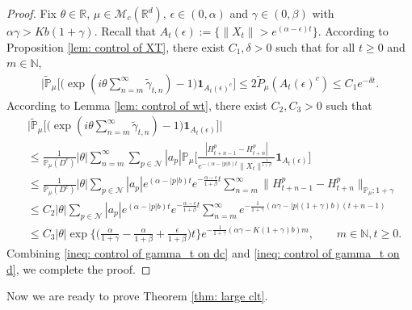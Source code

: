 \documentclass[12pt,a4paper]{amsart}
\theoremstyle{plain}
\theoremstyle{definition}
\numberwithin{equation}{section}
\begin{document}
\begin{proof}
    Fix $\theta \in \mathbb R$, $\mu \in \mathcal M_c(\mathbb R^d)$, $\epsilon \in (0,\alpha)$ and $\gamma \in (0,\beta)$ with $\alpha \gamma > Kb(1+\gamma)$.
    Recall that $A_t(\epsilon):=\{\|X_t\|> e^{(\alpha-\epsilon) t}\}$. 
    According to Proposition \ref{lem: control of XT}, there exist $C_1,\delta>0$ such that for all $t\geq 0$ and $m\in \mathbb N$,
\begin{align}\label{ineq: control of gamma_t on dc}
    \Big|\tilde{\mathbb{P}}_{\mu}\Big[\big(\exp(i\theta \sum_{n=m}^{\infty}\tilde{\gamma}_{t,n})-1\big)\mathbf{1}_{A_t(\epsilon)^c}\Big]
    \leq 2\tilde{P}_{\mu}(A_t(\epsilon)^c)
    \leq C_1 e^{-\delta t}.
\end{align}
    According to Lemma \ref{lem: control of wt}, there exist $C_2,C_3>0$ such that
\begin{align}\label{ineq: control of gamma_t on d}
    &\Big|\tilde{\mathbb{P}}_{\mu}\Big[\big(\exp(i\theta \sum_{n=m}^{\infty}\tilde{\gamma}_{t,n})-1\big)\mathbf{1}_{A_t(\epsilon)}\Big]\Big|\\
    &\leq \frac{1}{\mathbb{P}_{\mu}(D^c)}|\theta|\sum_{n=m}^{\infty}\sum_{p\in \mathcal{N}}|a_p|\mathbb{P}_{\mu}\Big[\frac{|H_{t+n-1}^p-H_{t+n}^p|}{e^{-(\alpha-|p|b)t}\|X_t\|^{\frac{1}{1+\beta}}}\mathbf{1}_{A_t(\epsilon)}\Big]\\
    &\leq  \frac{1}{\mathbb{P}_{\mu}(D^c)}|\theta|\sum_{p\in \mathcal{N}}|a_p|e^{(\alpha-|p|b)t}e^{-\frac{\alpha-\epsilon}{1+\beta}t}\sum_{n=m}^{\infty}\|H_{t+n-1}^p-H_{t+n}^p\|_{\mathbb{P}_{\mu};1+\gamma}\\
    &\leq C_2|\theta|\sum_{p\in \mathcal{N}}|a_p|e^{(\alpha-|p|b)t}e^{-\frac{\alpha-\epsilon}{1+\beta}t}\sum_{n=m}^{\infty}e^{-\frac{1}{1+\gamma}(\alpha\gamma-|p|(1+\gamma)b)(t+n-1)}\\
    &\leq C_3|\theta|\exp\Big\{\Big(\frac{\alpha}{1+\gamma}-\frac{\alpha}{1+\beta}+\frac{\epsilon}{1+\beta}\Big)t\Big\}e^{-\frac{1}{1+\gamma}(\alpha\gamma-K(1+\gamma)b)m},
    \qquad m\in \mathbb{N}, t\geq 0.
\end{align}
    Combining \eqref{ineq: control of gamma_t on dc} and \eqref{ineq: control of gamma_t on d}, we complete the proof.
\end{proof}
    Now we are ready to prove Theorem \ref{thm: large clt}.
\bigskip
\end{document}
